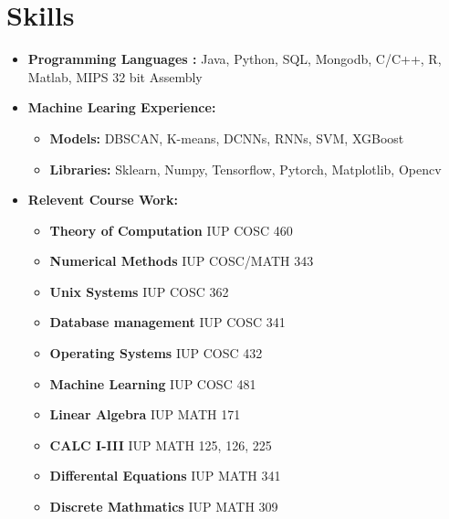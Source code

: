 \documentclass[12pt]{article}
\begin{document}
\section{Skills}
\begin{itemize}
    \itemsep=-.3em
    \item \textbf{Programming Languages :} Java, Python, SQL, Mongodb, C/C++, R, Matlab, MIPS 32 bit Assembly  
    \item \textbf{Machine Learing Experience:} 
          \begin{itemize}
              \item \textbf{Models:} DBSCAN, K-means, DCNNs, RNNs, SVM, XGBoost 
              \item \textbf{Libraries:} Sklearn, Numpy, Tensorflow, Pytorch, Matplotlib, Opencv 
	  \end{itemize}
	
    \item \textbf{Relevent Course Work:} 
          \begin{itemize}
              \item \textbf{Theory of Computation} \hfill IUP COSC 460
              \item \textbf{Numerical Methods} \hfill IUP COSC/MATH 343
              \item \textbf{Unix Systems} \hfill IUP COSC 362
              \item \textbf{Database management} \hfill IUP COSC 341
              \item \textbf{Operating Systems} \hfill IUP COSC 432
              \item \textbf{Machine Learning} \hfill IUP COSC 481 
              \item \textbf{Linear Algebra} \hfill IUP MATH 171
              \item \textbf{CALC I-III} \hfill IUP MATH 125, 126, 225
              \item \textbf{Differental Equations} \hfill IUP MATH 341
              \item \textbf{Discrete Mathmatics} \hfill IUP MATH 309

          \end{itemize}
\end{itemize}
\end{document}
